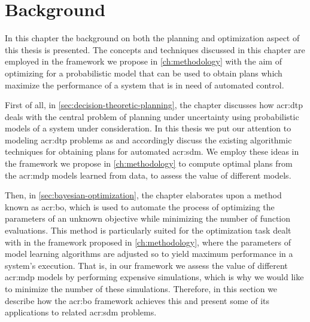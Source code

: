 \chapter{Background}
\label{ch:background}

In this chapter the background on both the planning and optimization aspect of this thesis is presented.
The concepts and techniques discussed in this chapter are employed in the framework we propose in \autoref{ch:methodology} with the aim of optimizing for a probabilistic model that can be used to obtain plans which maximize the performance of a system that is in need of automated control.

First of all, in \autoref{sec:decision-theoretic-planning}, the chapter discusses how \acrfull{acr:dtp} deals with the central problem of planning under uncertainty using probabilistic models of a system under consideration.
In this thesis we put our attention to modeling \acrshort{acr:dtp} problems as  and accordingly discuss the existing algorithmic techniques for obtaining plans for automated \acrfull{acr:sdm}.
We employ these ideas in the framework we propose in \autoref{ch:methodology} to compute optimal plans from the \acrshort{acr:mdp} models learned from data, to assess the value of different models.

Then, in \autoref{sec:bayesian-optimization}, the chapter elaborates upon a method known as \acrfull{acr:bo}, which is used to automate the process of optimizing the parameters of an unknown objective while minimizing the number of function evaluations.
This method is particularly suited for the optimization task dealt with in the framework proposed in \autoref{ch:methodology}, where the parameters of model learning algorithms are adjusted so to yield maximum performance in a system's execution.
That is, in our framework we assess the value of different \acrshort{acr:mdp} models by performing expensive simulations, which is why we would like to minimize the number of these simulations.
Therefore, in this section we describe how the \acrshort{acr:bo} framework achieves this and present some of its applications to related \acrshort{acr:sdm} problems.




\newpage


